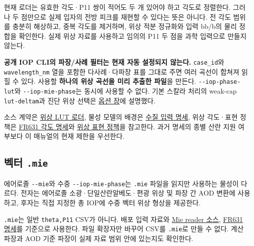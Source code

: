 현재 로더는 유효한 각도·P11 쌍이 적어도 두 개 있어야 하고 각도로 정렬한다. 그러나 두 점만으로 실제 입자의 전방 피크를 재현할 수 있다는 뜻은 아니다. 전 각도 범위를 충분히 해상하고, 중복 각도를 제거하며, 위상 적분 정규화와 입력 bb/b의 물리 정합을 확인한다. 실제 위상 자료를 사용하고 임의의 P11 두 점을 과학 입력으로 만들지 않는다.

\textbf{공개 IOP CLI의 파장/사례 필터는 현재 자동 설정되지 않는다.} \texttt{case\_\allowbreak{}id}와 \texttt{wavelength\_\allowbreak{}nm} 열을 포함한 다사례·다파장 표를 그대로 주면 여러 곡선이 합쳐져 읽힐 수 있다. 사용할 \textbf{하나의 위상 곡선을 미리 추출한 파일}을 만든다. \texttt{-\allowbreak{}-\allowbreak{}iop-\allowbreak{}phase-\allowbreak{}lut}와 \texttt{-\allowbreak{}-\allowbreak{}iop-\allowbreak{}mie-\allowbreak{}phase}는 동시에 사용할 수 없다. 기본 스칼라 처리의 weak-cap \texttt{lut-\allowbreak{}deltam}과 진단 위상 선택은 \hyperref[chap:03_options]{옵션 장}에 설명했다.

소스 계약은 \href{https://github.com/brtnt/OCRT/blob/54861c68e35ec5aaa3938fad53e93dc2dfa7eb1d/code/OCRT_C/src/rt_water_rt.c\#L1469}{위상 LUT 로더}, 물성 모델의 배경은 \href{https://github.com/brtnt/OCRT/blob/54861c68e35ec5aaa3938fad53e93dc2dfa7eb1d/code/OCRT_C/docs/WATER_INPUT_INTERFACE_v1.19_2026-07-18.md}{수질 입력 명세}, 위상 각도·표현 정책은 \href{https://github.com/brtnt/OCRT/blob/54861c68e35ec5aaa3938fad53e93dc2dfa7eb1d/code/OCRT_C/docs/PHASE_ANGLE_GRID_FR631_SPEC_KO.md}{FR631 각도 명세}와 \href{https://github.com/brtnt/OCRT/blob/54861c68e35ec5aaa3938fad53e93dc2dfa7eb1d/code/OCRT_C/docs/PHASE_REPRESENTATION_POLICY_KO.md}{위상 표현 정책}을 참고한다. 과거 명세의 종별 산란 지원 여부보다 이 매뉴얼의 현재 제한을 우선한다.

\subsection{벡터 \texttt{.\allowbreak{}mie}}
\label{sec:auto:08_input_formats:4.2}
에어로졸 \texttt{-\allowbreak{}-\allowbreak{}mie}와 수중 \texttt{-\allowbreak{}-\allowbreak{}iop-\allowbreak{}mie-\allowbreak{}phase}는 \texttt{.\allowbreak{}mie} 파일을 읽지만 사용하는 물성이 다르다. 전자는 에어로졸 소광·단일산란알베도·편광 위상 및 파장 간 AOD 변환에 사용하고, 후자는 직접 지정한 총 IOP에 수중 벡터 위상 형상을 제공한다.

\texttt{.\allowbreak{}mie}는 일반 \texttt{theta,\allowbreak{}P11} CSV가 아니다. 배포 입력 자료와 \href{https://github.com/brtnt/OCRT/blob/54861c68e35ec5aaa3938fad53e93dc2dfa7eb1d/code/OCRT_C/src/shared/mie_io.c}{Mie reader 소스}, \href{https://github.com/brtnt/OCRT/blob/54861c68e35ec5aaa3938fad53e93dc2dfa7eb1d/code/OCRT_C/docs/PHASE_ANGLE_GRID_FR631_SPEC_KO.md}{FR631 명세}를 기준으로 사용한다. 파일 확장자만 바꾸어 CSV를 \texttt{.\allowbreak{}mie}로 만들 수 없다. 계산 파장과 AOD 기준 파장이 실제 자료 범위 안에 있는지도 확인한다.

